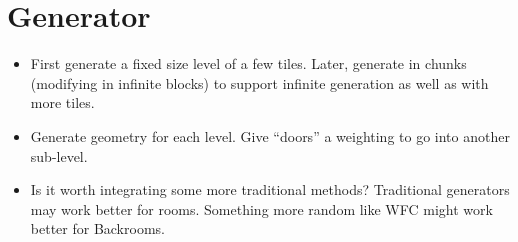 \section*{Generator}
\begin{itemize}
    \item First generate a fixed size level of a few tiles. Later, generate in chunks (modifying in infinite blocks) to support infinite generation as well as with more tiles.
    \item Generate geometry for each level. Give “doors” a weighting to go into another sub-level.
    \item Is it worth integrating some more traditional methods? Traditional generators may work better for rooms. Something more random like WFC might work better for Backrooms.
\end{itemize}

